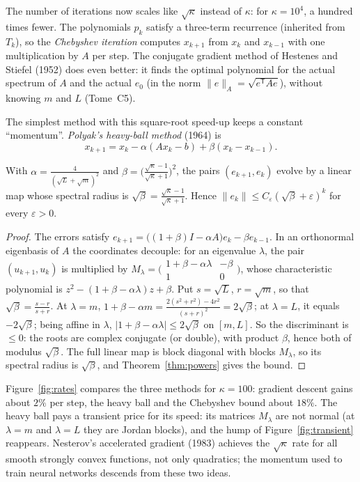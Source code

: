 The number of iterations now scales like $\sqrt\kappa$ instead of $\kappa$: for $\kappa=10^4$, a hundred times fewer. The polynomials
$p_k$ satisfy a three-term recurrence (inherited from $T_k$), so the \emph{Chebyshev iteration} computes $x_{k+1}$ from $x_k$ and $x_{k-1}$
with one multiplication by $A$ per step. The conjugate gradient method of Hestenes and Stiefel (1952) does even better: it finds
the optimal polynomial for the actual spectrum of $A$ and the actual $e_0$ (in the norm $\|e\|_A=\sqrt{e^{\mathsf T}Ae}$), without knowing $m$
and $L$ (Tome~C5).

The simplest method with this square-root speed-up keeps a constant ``momentum''. \emph{Polyak's heavy-ball method} (1964) is
\[
x_{k+1}=x_k-\alpha(Ax_k-b)+\beta(x_k-x_{k-1}).
\]

\begin{theorem}\label{thm:heavyball}
With $\alpha=\frac4{(\sqrt L+\sqrt m)^2}$ and $\beta=\bigl(\frac{\sqrt\kappa-1}{\sqrt\kappa+1}\bigr)^2$, the pairs $(e_{k+1},e_k)$ evolve by a
linear map whose spectral radius is $\sqrt\beta=\frac{\sqrt\kappa-1}{\sqrt\kappa+1}$. Hence $\|e_k\|\le C_\varepsilon(\sqrt\beta+\varepsilon)^k$ for every
$\varepsilon>0$.
\end{theorem}
\begin{proof}
The errors satisfy $e_{k+1}=\bigl((1+\beta)I-\alpha A\bigr)e_k-\beta e_{k-1}$. In an orthonormal eigenbasis of $A$ the coordinates decouple:
for an eigenvalue $\lambda$, the pair $(u_{k+1},u_k)$ is multiplied by $M_\lambda=\bigl(\begin{smallmatrix}1+\beta-\alpha\lambda&-\beta\\1&0
\end{smallmatrix}\bigr)$, whose characteristic polynomial is $z^2-(1+\beta-\alpha\lambda)z+\beta$. Put $s=\sqrt L$, $r=\sqrt m$, so that
$\sqrt\beta=\frac{s-r}{s+r}$. At $\lambda=m$, $1+\beta-\alpha m=\frac{2(s^2+r^2)-4r^2}{(s+r)^2}=2\sqrt\beta$; at $\lambda=L$, it equals $-2\sqrt\beta$;
being affine in $\lambda$, $|1+\beta-\alpha\lambda|\le2\sqrt\beta$ on $[m,L]$. So the discriminant is $\le0$: the roots are complex conjugate
(or double), with product $\beta$, hence both of modulus $\sqrt\beta$. The full linear map is block diagonal with blocks $M_\lambda$, so
its spectral radius is $\sqrt\beta$, and Theorem~\ref{thm:powers} gives the bound.
\end{proof}

Figure~\ref{fig:rates} compares the three methods for $\kappa=100$: gradient descent gains about $2\%$ per step, the heavy ball and the
Chebyshev bound about $18\%$. The heavy ball pays a transient price for its speed: its matrices $M_\lambda$ are not normal (at
$\lambda=m$ and $\lambda=L$ they are Jordan blocks), and the hump of Figure~\ref{fig:transient} reappears. Nesterov's accelerated
gradient (1983) achieves the $\sqrt\kappa$ rate for all smooth strongly convex functions, not only quadratics; the momentum used to train
neural networks descends from these two ideas.

